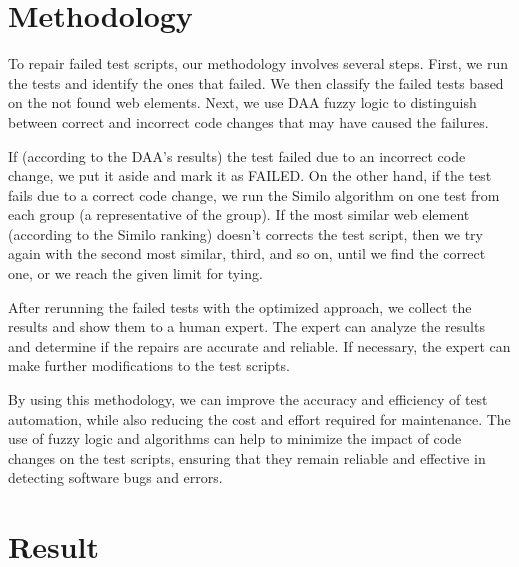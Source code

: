 \documentclass{article}
\begin{document}
\maketitle

\section{Methodology}

To repair failed test scripts, our methodology involves several steps. First, we run the tests and identify the ones that failed. We then classify the failed tests based on the not found web elements. Next, we use DAA fuzzy logic\cite{fuzzy_ai_in_web_testing} to distinguish between correct and incorrect code changes that may have caused the failures.

If (according to the DAA's results) the test failed due to an incorrect code change, we put it aside and mark it as FAILED. On the other hand, if the test fails due to a correct code change, we run the Similo\cite{similo} algorithm on one test from each group (a representative of the group). If the most similar web element (according to the Similo\cite{similo} ranking) doesn't corrects the test script, then we try again with the second most similar, third, and so on, until we find the correct one, or we reach the given limit for tying. 

After rerunning the failed tests with the optimized approach, we collect the results and show them to a human expert. The expert can analyze the results and determine if the repairs are accurate and reliable. If necessary, the expert can make further modifications to the test scripts.

By using this methodology, we can improve the accuracy and efficiency of test automation, while also reducing the cost and effort required for maintenance. The use of fuzzy logic and algorithms can help to minimize the impact of code changes on the test scripts, ensuring that they remain reliable and effective in detecting software bugs and errors.



\maketitle

\section{Result}
\end{document}

